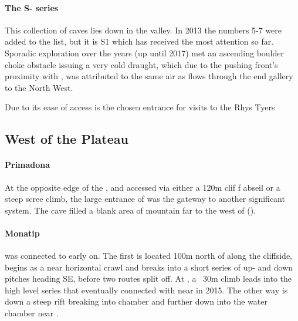 \paragraph{The S- series}  This collection of caves lies down in   the  valley. In 2013 the numbers 5-7 were added to the list, but it is S1 which has received the most attention so far. Sporadic exploration over the years (up until 2017) met an ascending boulder choke obstacle issuing a very cold draught, which due to the pushing front's proximity with , was attributed to the same air as flows through the end  gallery to the North West.

\begin{marginfigure}
\checkoddpage \ifoddpage \forcerectofloat \else \forceversofloat \fi
\centering
 \caption{Due to its ease of access \protect{} is the chosen entrance for visits to the \protect{} \pic Rhys Tyers}
 \label{surfaceM16}
\end{marginfigure}

\subsection{West of the Plateau} 

\paragraph{Primadona} At the opposite edge of the , and accessed via either a 120m clif f abseil or a steep scree climb, the large entrance of  was the gateway to another significant system. The cave filled a blank area of mountain far to the west of  ().

\paragraph{Monatip}  was connected to  early on. The first is located 100m north of  along the cliffside, begins as a near horizontal crawl and breaks into a short series of up- and down pitches heading SE, before two routes split off. At , a ~30m climb leads into the high level series that eventually connected with  near  in 2015. The other way is down a steep rift breaking into  chamber and further down into the water chamber near .

